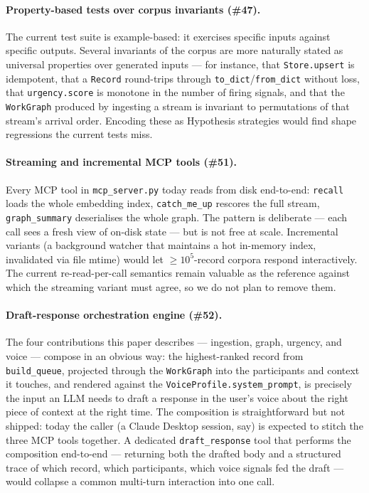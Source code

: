 \paragraph{Property-based tests over corpus invariants (\#47).}
The current test suite is example-based: it exercises specific inputs against specific outputs. Several invariants of the corpus are more naturally stated as universal properties over generated inputs --- for instance, that \texttt{Store.upsert} is idempotent, that a \texttt{Record} round-trips through \texttt{to\_dict}/\texttt{from\_dict} without loss, that \texttt{urgency.score} is monotone in the number of firing signals, and that the \texttt{WorkGraph} produced by ingesting a stream is invariant to permutations of that stream's arrival order. Encoding these as Hypothesis strategies would find shape regressions the current tests miss.

\paragraph{Streaming and incremental MCP tools (\#51).}
Every MCP tool in \texttt{mcp\_server.py} today reads from disk end-to-end: \texttt{recall} loads the whole embedding index, \texttt{catch\_me\_up} rescores the full stream, \texttt{graph\_summary} deserialises the whole graph. The pattern is deliberate --- each call sees a fresh view of on-disk state --- but is not free at scale. Incremental variants (a background watcher that maintains a hot in-memory index, invalidated via file mtime) would let $\geq 10^5$-record corpora respond interactively. The current re-read-per-call semantics remain valuable as the reference against which the streaming variant must agree, so we do not plan to remove them.

\paragraph{Draft-response orchestration engine (\#52).}
The four contributions this paper describes --- ingestion, graph, urgency, and voice --- compose in an obvious way: the highest-ranked record from \texttt{build\_queue}, projected through the \texttt{WorkGraph} into the participants and context it touches, and rendered against the \texttt{VoiceProfile.system\_prompt}, is precisely the input an LLM needs to draft a response in the user's voice about the right piece of context at the right time. The composition is straightforward but not shipped: today the caller (a Claude Desktop session, say) is expected to stitch the three MCP tools together. A dedicated \texttt{draft\_response} tool that performs the composition end-to-end --- returning both the drafted body and a structured trace of which record, which participants, which voice signals fed the draft --- would collapse a common multi-turn interaction into one call.

